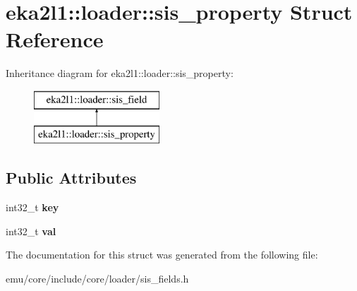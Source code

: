 \hypertarget{structeka2l1_1_1loader_1_1sis__property}{}\section{eka2l1\+:\+:loader\+:\+:sis\+\_\+property Struct Reference}
\label{structeka2l1_1_1loader_1_1sis__property}
Inheritance diagram for eka2l1\+:\+:loader\+:\+:sis\+\_\+property\+:\begin{figure}[H]
\begin{center}
\leavevmode
\includegraphics[height=2.000000cm]{structeka2l1_1_1loader_1_1sis__property}
\end{center}
\end{figure}
\subsection*{Public Attributes}
\begin{DoxyCompactItemize}
\item 
\mbox{\label{structeka2l1_1_1loader_1_1sis__property_a27e6539303f9e8e78d2dccbf61ae2a2c}} 
int32\+\_\+t {\bfseries key}
\item 
\mbox{\label{structeka2l1_1_1loader_1_1sis__property_af3b762412dbefe5703bd3a7e9e57ed94}} 
int32\+\_\+t {\bfseries val}
\end{DoxyCompactItemize}


The documentation for this struct was generated from the following file\+:\begin{DoxyCompactItemize}
\item 
emu/core/include/core/loader/sis\+\_\+fields.\+h\end{DoxyCompactItemize}
